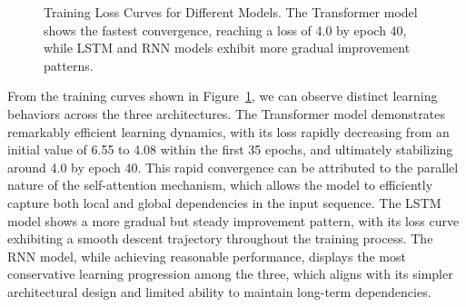 \documentclass[12pt,oneside]{article}
\begin{document}
\begin{figure}[!htb]
    \centering
    \caption{Training Loss Curves for Different Models. The Transformer model shows the fastest convergence, reaching a loss of 4.0 by epoch 40, while LSTM and RNN models exhibit more gradual improvement patterns.}
    \label{fig:training_loss}
\end{figure}

From the training curves shown in Figure~\ref{fig:training_loss}, we can observe distinct learning behaviors across the three architectures. The Transformer model demonstrates remarkably efficient learning dynamics, with its loss rapidly decreasing from an initial value of 6.55 to 4.08 within the first 35 epochs, and ultimately stabilizing around 4.0 by epoch 40. This rapid convergence can be attributed to the parallel nature of the self-attention mechanism, which allows the model to efficiently capture both local and global dependencies in the input sequence. The LSTM model shows a more gradual but steady improvement pattern, with its loss curve exhibiting a smooth descent trajectory throughout the training process. The RNN model, while achieving reasonable performance, displays the most conservative learning progression among the three, which aligns with its simpler architectural design and limited ability to maintain long-term dependencies.
\end{document}
